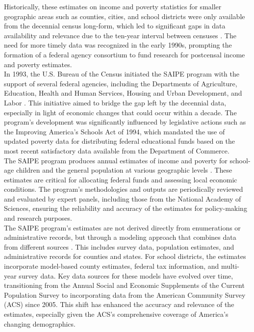 \documentclass[sn-mathphys-num]{sn-jnl}%
\theoremstyle{thmstyleone}%
\theoremstyle{thmstyletwo}%
\theoremstyle{thmstylethree}%
\begin{document}
Historically, these estimates on income and poverty statistics for smaller geographic areas such as counties, cities, and school districts were only available from the decennial census long-form, which led to significant gaps in data availability and relevance due to the ten-year interval between censuses \cite{saipe_about}. The need for more timely data was recognized in the early 1990s, prompting the formation of a federal agency consortium to fund research for postcensal income and poverty estimates.\\

In 1993, the U.S. Bureau of the Census initiated the SAIPE program with the support of several federal agencies, including the Departments of Agriculture, Education, Health and Human Services, Housing and Urban Development, and Labor \cite{saipe_about}. This initiative aimed to bridge the gap left by the decennial data, especially in light of economic changes that could occur within a decade. The program's development was significantly influenced by legislative actions such as the Improving America's Schools Act of 1994, which mandated the use of updated poverty data for distributing federal educational funds based on the most recent satisfactory data available from the Department of Commerce.\\

The SAIPE program produces annual estimates of income and poverty for school-age children and the general population at various geographic levels \cite{saipe_about}. These estimates are critical for allocating federal funds and assessing local economic conditions. The program's methodologies and outputs are periodically reviewed and evaluated by expert panels, including those from the National Academy of Sciences, ensuring the reliability and accuracy of the estimates for policy-making and research purposes.\\

The SAIPE program's estimates are not derived directly from enumerations or administrative records, but through a modeling approach that combines data from different sources \cite{saipe_about}. This includes survey data, population estimates, and administrative records for counties and states. For school districts, the estimates incorporate model-based county estimates, federal tax information, and multi-year survey data. Key data sources for these models have evolved over time, transitioning from the Annual Social and Economic Supplements of the Current Population Survey to incorporating data from the American Community Survey (ACS) since 2005. This shift has enhanced the accuracy and relevance of the estimates, especially given the ACS's comprehensive coverage of America's changing demographics.\\
\end{document}
